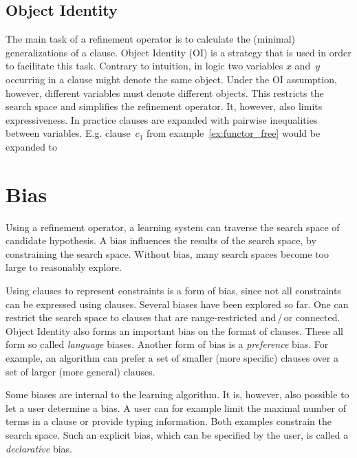 \subsection{Object Identity}
The main task of a refinement operator is to calculate the (minimal) generalizations of a clause. Object Identity (OI) is a strategy that is used in order to facilitate this task. Contrary to intuition, in logic two variables $x$ and~$y$ occurring in a clause might denote the same object. Under the OI assumption, however, different variables must denote different objects. This restricts the search space and simplifies the refinement operator. It, however, also limits expressiveness. In practice clauses are expanded with pairwise inequalities between variables. E.g. clause~$c_1$ from example~\ref{ex:functor_free} would be expanded to 

\section{Bias}
Using a refinement operator, a learning system can traverse the search space of candidate hypothesis. A bias influences the results of the search space, by constraining the search space. Without bias, many search spaces become too large to reasonably explore.

Using clauses to represent constraints is a form of bias, since not all constraints can be expressed using clauses. Several biases have been explored so far. One can restrict the search space to clauses that are range-restricted and\,/\,or connected. Object Identity also forms an important bias on the format of clauses. These all form so called \textit{language} biases. Another form of bias is a \textit{preference} bias. For example, an algorithm can prefer a set of smaller (more specific) clauses over a set of larger (more general) clauses.

Some biases are internal to the learning algorithm. It is, however, also possible to let a user determine a bias. A user can for example limit the maximal number of terms in a clause or provide typing information. Both examples constrain the search space. Such an explicit bias, which can be specified by the user, is called a \textit{declarative} bias.